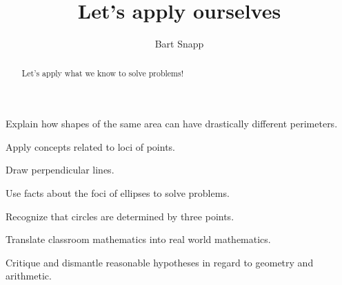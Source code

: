 \documentclass[nooutcomes,noauthor,hints,handout]{ximera}
\title{Let's apply ourselves}
\author{Bart Snapp}
\begin{document}
\begin{abstract}
  Let's apply what we know to solve problems!
\end{abstract}
\maketitle


\begin{listOutcomes}
\item Explain how shapes of the same area can have drastically
  different perimeters.
\item Apply concepts related to loci of points.
\item Draw perpendicular lines.
\item Use facts about the foci of ellipses to solve problems.    
\item Recognize that circles are determined by three points.
\item Translate classroom mathematics into real world mathematics. 
\item Critique and dismantle reasonable hypotheses in regard to geometry and arithmetic.
\end{listOutcomes}


\mynewpage
\end{document}
